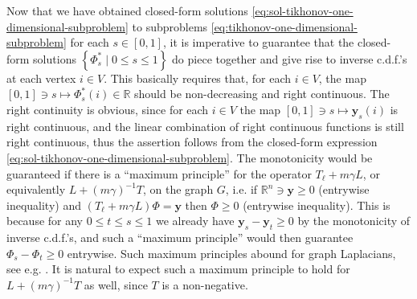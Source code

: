 \documentclass[letterpaper]{article} %
\begin{document}
Now that we have obtained closed-form solutions \eqref{eq:sol-tikhonov-one-dimensional-subproblem} to subproblems \eqref{eq:tikhonov-one-dimensional-subproblem} for each $s\in \left[ 0,1 \right]$, it is imperative to guarantee that the closed-form solutions $\left\{ \Phi_s^{*}\mid 0\leq s\leq 1 \right\}$ do piece together and give rise to inverse c.d.f.'s at each vertex $i\in V$. This basically requires that, for each $i\in V$, the map $\left[ 0,1 \right]\ni s\mapsto \Phi_s^{*}\left( i \right)\in\mathbb{R}$ should be non-decreasing and right continuous. The right continuity is obvious, since for each $i\in V$ the map $\left[ 0,1 \right]\ni s\mapsto \mathbf{y}_s \left( i \right)$ is right continuous, and the linear combination of right continuous functions is still right continuous, thus the assertion follows from the closed-form expression \eqref{eq:sol-tikhonov-one-dimensional-subproblem}. The monotonicity would be guaranteed if there is a ``maximum principle'' for the operator $T_{\ell}+m\gamma L$, or equivalently $L+\left( m\gamma \right)^{-1}T$, on the graph $G$, i.e. if $\mathbb{R}^{n}\ni \mathbf{y}\geq 0$ (entrywise inequality) and $\left( T_{\ell}+m\gamma L \right)\Phi=\mathbf{y}$ then $\Phi\geq 0$ (entrywise inequality). This is because for any $0\leq t\leq s\leq 1$ we already have $\mathbf{y}_s-\mathbf{y}_t\geq 0$ by the monotonicity of inverse c.d.f.'s, and such a ``maximum principle'' would then guarantee $\Phi_s-\Phi_t\geq 0$ entrywise. Such maximum principles abound for graph Laplacians, see e.g. \cite{HS1997,CCK2007}. It is natural to expect such a maximum principle to hold for $L+\left( m\gamma \right)^{-1}T$ as well, since $T$ is a non-negative.
\end{document}
